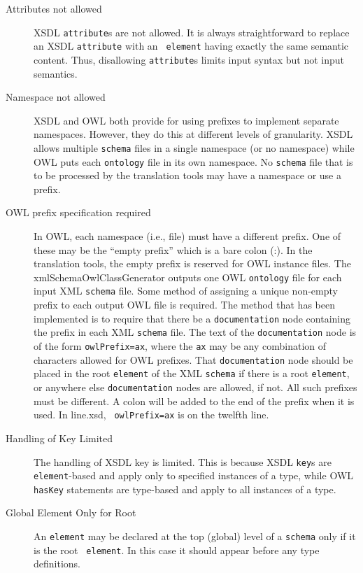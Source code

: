 \documentclass[preprint,12pt]{elsarticle}
\begin{document}
\begin{description}
\item [Attributes not allowed] XSDL {\tt attribute}s are not allowed. It is
  always straightforward to replace an XSDL {\tt attribute} with an {\tt
    element} having exactly the same semantic content. Thus, disallowing
  {\tt attribute}s limits input syntax but not input semantics.

\item [Namespace not allowed] XSDL and OWL both provide for using prefixes
  to implement separate namespaces. However, they do this at different
  levels of granularity. XSDL allows multiple {\tt schema} files in a
  single namespace (or no namespace) while OWL puts each {\tt ontology}
  file in its own namespace. No {\tt schema} file that is to be processed
  by the translation tools may have a namespace or use a prefix.

\item [OWL prefix specification required] In OWL, each namespace (i.e.,
  file) must have a different prefix. One of these may be the “empty
  prefix” which is a bare colon (:). In the translation tools, the empty
  prefix is reserved for OWL instance files. The xmlSchemaOwlClassGenerator
  outputs one OWL {\tt ontology} file for each input XML {\tt schema} file.
  Some method of assigning a unique non-empty prefix to each output OWL
  file is required. The method that has been implemented is to require that
  there be a {\tt documentation} node containing the prefix in each XML
  {\tt schema} file. The text of the {\tt documentation} node is of the
  form {\tt owlPrefix=ax}, where the {\tt ax} may be any combination of
  characters allowed for OWL prefixes. That {\tt documentation} node should
  be placed in the root {\tt element} of the XML {\tt schema} if there is a
  root {\tt element}, or anywhere else {\tt documentation} nodes are
  allowed, if not. All such prefixes must be different. A colon will be
  added to the end of the prefix when it is used. In line.xsd, {\tt
    owlPrefix=ax} is on the twelfth line.

\item [Handling of Key Limited] The handling of XSDL {\tt}key is limited.
  This is because XSDL {\tt key}s are {\tt element}-based and apply only to
  specified instances of a type, while OWL {\tt hasKey} statements are
  type-based and apply to all instances of a type.

\item [Global Element Only for Root] An {\tt element} may be declared at
  the top (global) level of a {\tt schema} only if it is the root {\tt
    element}. In this case it should appear before any type definitions.


\end{description}
\end{document}

